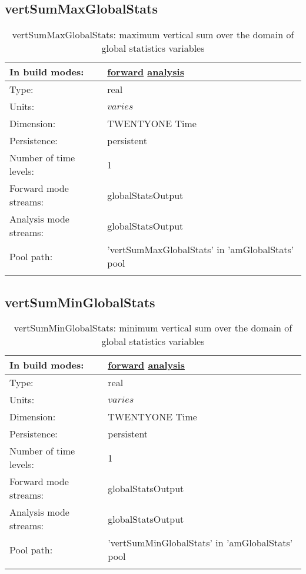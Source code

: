 \subsection[vertSumMaxGlobalStats]{vertSumMaxGlobalStats}
\label{subsec:var_sec_amGlobalStats_vertSumMaxGlobalStats}
\begin{center}
\begin{longtable}{| p{2.0in} | p{4.0in} |}
        \hline 
        In build modes: & \hyperref[subsec:forward_var_tab_amGlobalStats]{forward} \hyperref[subsec:analysis_var_tab_amGlobalStats]{analysis} \\
        \hline 
        Type: & real \\
        \hline 
        Units: & $varies$ \\
        \hline 
        Dimension: & TWENTYONE Time \\
        \hline 
        Persistence: & persistent \\
        \hline 
        Number of time levels: & 1 \\
        \hline 
		 Forward mode streams: &  globalStatsOutput \\
        \hline 
		 Analysis mode streams: &  globalStatsOutput \\
        \hline 
            Pool path: & 'vertSumMaxGlobalStats' in 'amGlobalStats' pool
 \\
		 \hline 
    \caption{vertSumMaxGlobalStats: maximum vertical sum over the domain of global statistics variables}
\end{longtable}
\end{center}
\subsection[vertSumMinGlobalStats]{vertSumMinGlobalStats}
\label{subsec:var_sec_amGlobalStats_vertSumMinGlobalStats}
\begin{center}
\begin{longtable}{| p{2.0in} | p{4.0in} |}
        \hline 
        In build modes: & \hyperref[subsec:forward_var_tab_amGlobalStats]{forward} \hyperref[subsec:analysis_var_tab_amGlobalStats]{analysis} \\
        \hline 
        Type: & real \\
        \hline 
        Units: & $varies$ \\
        \hline 
        Dimension: & TWENTYONE Time \\
        \hline 
        Persistence: & persistent \\
        \hline 
        Number of time levels: & 1 \\
        \hline 
		 Forward mode streams: &  globalStatsOutput \\
        \hline 
		 Analysis mode streams: &  globalStatsOutput \\
        \hline 
            Pool path: & 'vertSumMinGlobalStats' in 'amGlobalStats' pool
 \\
		 \hline 
    \caption{vertSumMinGlobalStats: minimum vertical sum over the domain of global statistics variables}
\end{longtable}
\end{center}
